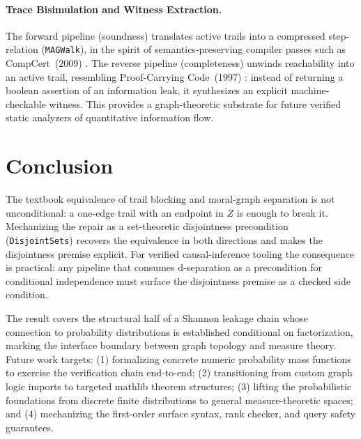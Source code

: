 \documentclass[acmsmall,screen,review,anonymous,nonacm]{acmart}
\newcommand{\lean}[1]{\lstinline!#1!}
\begin{document}
\paragraph{Trace Bisimulation and Witness Extraction.}
The forward pipeline (soundness) translates active trails into a compressed step-relation (\lean{MAGWalk}), in the spirit of semantics-preserving compiler passes such as CompCert~(2009) \cite{leroy2009formal}. The reverse pipeline (completeness) unwinds reachability into an active trail, resembling Proof-Carrying Code~(1997) \cite{necula1997proof}: instead of returning a boolean assertion of an information leak, it synthesizes an explicit machine-checkable witness. This provides a graph-theoretic substrate for future verified static analyzers of quantitative information flow.



\section{Conclusion}\label{sec:conclusion}

The textbook equivalence of trail blocking and moral-graph separation is
not unconditional: a one-edge trail with an endpoint in $Z$ is enough to
break it.  Mechanizing the repair as a set-theoretic disjointness precondition
(\lean{DisjointSets}) recovers the equivalence in both directions and makes
the disjointness premise explicit.  For verified causal-inference tooling the
consequence is practical: any pipeline that consumes d-separation as a
precondition for conditional independence must surface the disjointness
premise as a checked side condition.

The result covers the structural half of a Shannon
leakage chain whose connection to probability distributions is established
conditional on factorization, marking the interface boundary between
graph topology and measure theory. Future work targets: (1) formalizing
concrete numeric probability mass functions to exercise the verification
chain end-to-end; (2) transitioning from custom graph logic imports to
targeted mathlib theorem structures; (3) lifting the probabilistic foundations
from discrete finite distributions to general measure-theoretic spaces; and
(4) mechanizing the first-order surface syntax, rank checker, and query safety
guarantees.





\end{document}
